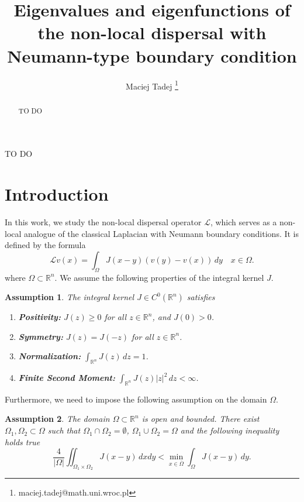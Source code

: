 \documentclass[11pt, a4paper]{article}
\title{Eigenvalues and eigenfunctions of the non-local dispersal with Neumann-type boundary condition}
\author[1]{Maciej Tadej \thanks{maciej.tadej@math.uni.wroc.pl}}
\affil[1]{\textit{Institute of Mathematics, University of Wrocław, pl. Grunwaldzki 2, 50-384 Wrocław, Poland}}
\date{}
\theoremstyle{break}
\theoremstyle{break}
\theoremstyle{break}
\newtheorem{asm}{Assumption}[section]
\theoremstyle{break}
\theoremstyle{break}
\theoremstyle{break}
\theoremstyle{break}
\theoremstyle{break}
\theoremstyle{break}
\begin{document}
\maketitle

\hspace{20pt}

\begin{abstract}
TO DO
\end{abstract}

\begin{keywords}
TO DO
\end{keywords}

\newpage

\section{Introduction}

In this work, we study the non-local dispersal operator $\mathcal{L}$, which serves as a non-local analogue of the classical Laplacian with Neumann boundary conditions. It is defined by the formula
\begin{equation}
    \label{EQ:NonLocalNeumann}
    \mathcal{L}v(x) = \int_{\Omega} J(x-y) (v(y) - v(x)) \, dy \quad x \in \Omega.
\end{equation}
where $\Omega \subset \mathbb{R}^n$. We assume the following properties of the integral kernel $J$.

\begin{asm} 
    \label{asm:KernelProperties}
    The integral kernel $J \in C^0(\mathbb{R}^n)$ satisfies
    \begin{enumerate}[label=(\textit{J\arabic*})]
        \item \textbf{Positivity:} $J(z) \geq 0$ for all $z \in \mathbb{R}^n$, and $J(0) > 0$.
        \item \textbf{Symmetry:} $J(z) = J(-z)$ for all $z \in \mathbb{R}^n$.
        \item \textbf{Normalization:} $\int_{\mathbb{R}^n} J(z) \, dz = 1$.
        \item \textbf{Finite Second Moment:} $\int_{\mathbb{R}^n} J(z)|z|^2 \, dz < \infty$.
    \end{enumerate}
\end{asm}

Furthermore, we need to impose the following assumption on the domain $\Omega$.

\begin{asm}
    \label{asm:DomainProperties}
    The domain $\Omega \subset \mathbb{R}^n$ is open and bounded. There exist $\Omega_1, \Omega_2 \subset \Omega$ such that $\Omega_1 \cap \Omega_2 = \emptyset$, $\Omega_1 \cup \Omega_2 = \Omega$ and the following inequality holds true
    \begin{equation}\label{eq:sufficient_cond}
        \frac{4}{|\Omega|} \iint_{\Omega_1 \times \Omega_2} J(x-y) \, dx dy < \min_{x \in \overline{\Omega}} \int_\Omega J(x-y) \, dy.
    \end{equation}
\end{asm}
\end{document}
